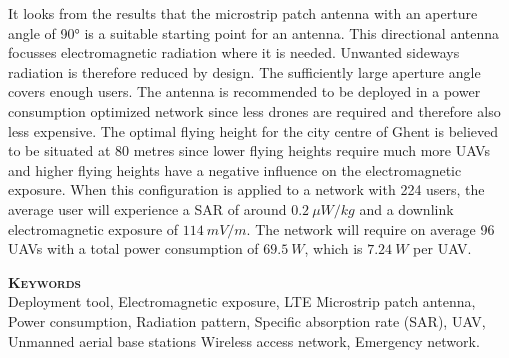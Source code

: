 It looks from the results that 
the microstrip patch antenna with an aperture angle of \ang{90} is a suitable starting point for an antenna. 
This directional antenna focusses electromagnetic radiation where it is needed. Unwanted sideways radiation 
is therefore reduced by design.
The sufficiently large aperture angle covers enough users. The antenna is recommended to be deployed in a power consumption 
optimized network since less drones are required and therefore also less expensive.
The optimal flying height for the city centre of Ghent is believed to be situated at 80 metres since lower flying heights require much more UAVs and
higher flying heights have a negative influence on the electromagnetic exposure.  
When this configuration is applied to a network with 224 users, the average user will 
experience a SAR of around $0.2\ \mu W/kg$ and
 a downlink electromagnetic exposure of $114\ mV/m$. The network will require on average 96 UAVs with a total
power consumption of $69.5\ W$, which is $7.24\ W$ per UAV.

\textsc{\textbf{\LARGE Keywords}}\\
Deployment tool,  Electromagnetic exposure, LTE
Microstrip patch antenna, Power consumption,
Radiation pattern, Specific absorption rate (SAR),
UAV, Unmanned aerial base stations
Wireless access network, Emergency network.